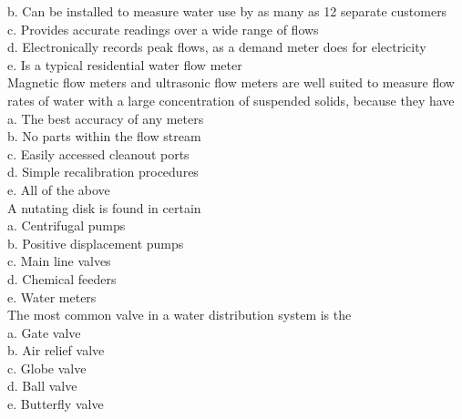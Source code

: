 b. Can be installed to measure water use by as many as 12 separate customers\\

c. Provides accurate readings over a wide range of flows\\

d. Electronically records peak flows, as a demand meter does for electricity\\

e. Is a typical residential water flow meter\\

Magnetic flow meters and ultrasonic flow meters are well suited to measure flow rates of water with a large concentration of suspended solids, because they have\\


a. The best accuracy of any meters\\

b. No parts within the flow stream\\

c. Easily accessed cleanout ports\\

d. Simple recalibration procedures\\

e. All of the above\\

A nutating disk is found in certain\\
a. Centrifugal pumps\\

b. Positive displacement pumps\\

c. Main line valves\\

d. Chemical feeders\\

e. Water meters\\

The most common valve in a water distribution system is the\\
a. Gate valve\\

b. Air relief valve\\

c. Globe valve\\

d. Ball valve\\

e. Butterfly valve\\

